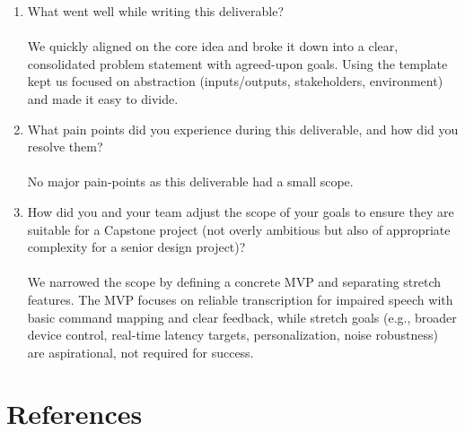 \documentclass{article}
\begin{document}
\begin{enumerate}
    \item What went well while writing this deliverable? \\ \\
    We quickly aligned on the core idea and broke it down into a clear, consolidated problem statement with agreed-upon goals. Using the template kept us focused on abstraction (inputs/outputs, stakeholders, environment) and made it easy to divide.
    \item What pain points did you experience during this deliverable, and how
    did you resolve them? \\ \\
    No major pain-points as this deliverable had a small scope.
    \item How did you and your team adjust the scope of your goals to ensure
    they are suitable for a Capstone project (not overly ambitious but also of
    appropriate complexity for a senior design project)? \\ \\
    We narrowed the scope by defining a concrete MVP and separating stretch features. The MVP focuses on reliable transcription for impaired speech with basic command mapping and clear feedback, while stretch goals (e.g., broader device control, real-time latency targets, personalization, noise robustness) are aspirational, not required for success.
\end{enumerate} 

\section*{References}


\end{document}
